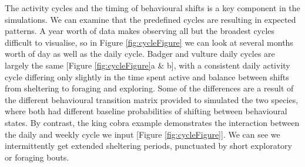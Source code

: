 \documentclass[10pt,a4paper]{article}
\begin{document}
The activity cycles and the timing of behavioural shifts is a key component in the simulations.
We can examine that the predefined cycles are resulting in expected patterns.
A year worth of data makes observing all but the broadest cycles difficult to visualise, so in Figure \ref{fig:cycleFigure} we can look at several months worth of day as well as the daily cycle.
Badger and vulture daily cycles are largely the same {[}Figure \ref{fig:cycleFigure}a \& b{]}, with a consistent daily activity cycle differing only slightly in the time spent active and balance between shifts from sheltering to foraging and exploring.
Some of the differences are a result of the different behavioural transition matrix provided to simulated the two species, where both had different baseline probabilities of shifting between behavioural states.
By contrast, the king cobra example demonstrates the interaction between the daily and weekly cycle we input {[}Figure \ref{fig:cycleFigure}{]}.
We can see we intermittently get extended sheltering periods, punctuated by short exploratory or foraging bouts.
\end{document}
